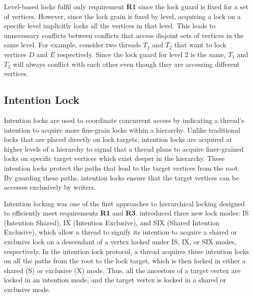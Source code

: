 Level-based locks fulfil only requirement \textbf{R1} since the lock guard is fixed for a set of vertices. 
However, since the lock grain is fixed by level, acquiring a lock on a specific level implicitly locks all the vertices in that level. This leads to unnecessary conflicts between conflicts that access disjoint sets of vertices in the same level. 
For example, consider two threads $T_1$ and $T_2$ that want to lock vertices $D$ and $E$ respectively.
Since the lock guard for level 2 is the same, $T_1$ and $T_2$ will always conflict with each other even though they are accessing different vertices. 



\subsection{Intention Lock}

Intention locks are used to coordinate concurrent access by indicating a thread’s intention to acquire more fine-grain locks within a hierarchy. Unlike traditional locks that are placed directly on lock targets, intention locks are acquired at higher levels of a hierarchy to signal that a thread plans to acquire finer-grained locks on specific target vertices which exist deeper in the hierarchy. These intention locks protect the paths that lead to the target vertices from the root. By guarding these paths, intention locks ensure that the target vertices can be accesses exclusively by writers.

Intention locking was one of the first approaches to hierarchical locking designed to efficiently meet requirements \textbf{R1} and \textbf{R3}. \citet{gray1975granularity} introduced three new lock modes: IS (Intention Shared), IX (Intention Exclusive), and SIX (Shared Intention Exclusive), which allow a thread to signify its intention to acquire a shared or exclusive lock on a descendant of a vertex locked under IS, IX, or SIX modes, respectively. In the intention lock protocol, a thread acquires these intention locks on all the paths from the root to the lock target, which is then locked in either a shared (S) or exclusive (X) mode. Thus, all the ancestors of a target vertex are locked in an intention mode, and the target vertex is locked in a shared or exclusive mode.

